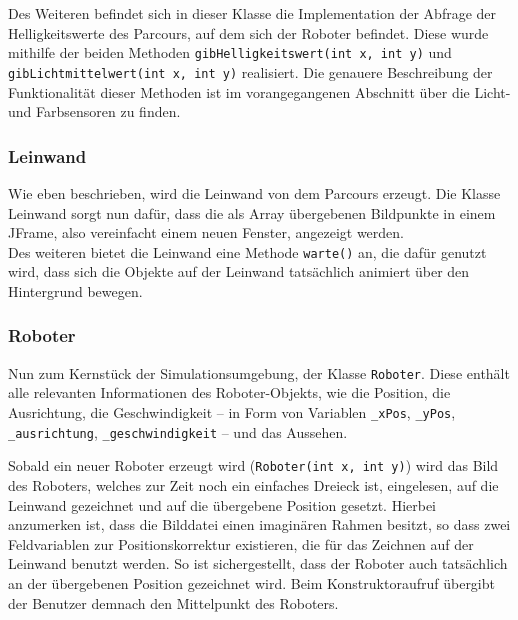 \documentclass[paper=a4, DIV=14, BCOR=15mm, twoside=on, onecolumn=on, open = right, titlepage =on, parskip =half, headsepline = on, footsepline = on, chapterprefix = on, appendixprefix = off, fontsize = 12pt, numbers = noenddot, abstract = on]{scrbook}
\begin{document}
Des Weiteren befindet sich in dieser Klasse die Implementation der Abfrage der Helligkeitswerte des Parcours, auf dem sich der Roboter befindet. Diese wurde mithilfe der beiden Methoden \texttt{gib\-Hellig\-keits\-wert(int x, int y)} und \texttt{gib\-Licht\-mittel\-wert(int x, int y)} realisiert. Die genauere Beschreibung der Funktionalität dieser Methoden ist im vorangegangenen Abschnitt über die Licht- und Farbsensoren zu finden.

\subsubsection{Leinwand}
Wie eben beschrieben, wird die Leinwand von dem Parcours erzeugt. Die Klasse Leinwand sorgt nun dafür, dass die als Array übergebenen Bildpunkte in einem JFrame, also vereinfacht einem neuen Fenster, angezeigt werden. \\
Des weiteren bietet die Leinwand eine Methode \texttt{warte()} an, die dafür genutzt wird, dass sich die Objekte auf der Leinwand tatsächlich animiert über den Hintergrund bewegen. 

\subsubsection{Roboter}
Nun zum Kernstück der Simulationsumgebung, der Klasse \texttt{Roboter}. Diese enthält alle relevanten Informationen des Roboter-Objekts, wie die Position, die Ausrichtung, die Geschwindigkeit -- in Form von Variablen \texttt{{\_}xPos}, \texttt{{\_}yPos}, \texttt{{\_}aus\-rich\-tung},  \texttt{{\_}ge\-schwin\-dig\-keit} -- und das Aussehen. 

Sobald ein neuer Roboter erzeugt wird (\texttt{Roboter(int x, int y)}) wird das Bild des Roboters, welches zur Zeit noch ein einfaches Dreieck ist, eingelesen, auf die Leinwand gezeichnet und auf die übergebene Position gesetzt. Hierbei anzumerken ist, dass die Bilddatei einen imaginären Rahmen besitzt, so dass zwei Feldvariablen zur Positionskorrektur existieren, die für das Zeichnen auf der Leinwand benutzt werden. So ist sichergestellt, dass der Roboter auch tatsächlich an der übergebenen Position gezeichnet wird. Beim Konstruktoraufruf übergibt der Benutzer demnach den Mittelpunkt des Roboters.
\end{document}
